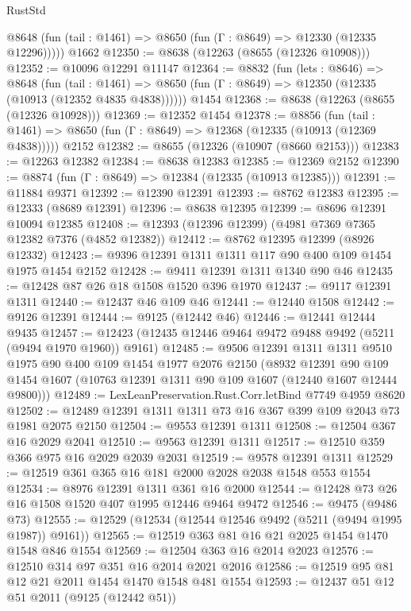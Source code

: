 \begin{lexlean}{RustStd}
\begin{coremodule}
      @8648 (fun (tail : @1461) => @8650 (fun (Γ : @8649) => @12330 (@12335 @12296)))))
    @1662
@12350 := @8638 (@12263 (@8655 (@12326 @10908)))
@12352 := @10096 @12291 @11147
@12364 := @8832
    (fun (lets : @8646) =>
    @8648
      (fun (tail : @1461) =>
      @8650 (fun (Γ : @8649) => @12350 (@12335 (@10913 (@12352 @4835 @4838))))))
    @1454
@12368 := @8638 (@12263 (@8655 (@12326 @10928)))
@12369 := @12352 @1454
@12378 := @8856
    (fun (tail : @1461) => @8650 (fun (Γ : @8649) => @12368 (@12335 (@10913 (@12369 @4838)))))
    @2152
@12382 := @8655 (@12326 (@10907 (@8660 @2153)))
@12383 := @12263 @12382
@12384 := @8638 @12383
@12385 := @12369 @2152
@12390 := @8874 (fun (Γ : @8649) => @12384 (@12335 (@10913 @12385)))
@12391 := @11884 @9371
@12392 := @12390 @12391
@12393 := @8762 @12383
@12395 := @12333 (@8689 @12391)
@12396 := @8638 @12395
@12399 := @8696 @12391 @10094 @12385
@12408 := @12393 (@12396 @12399) (@4981 @7369 @7365 @12382 @7376 (@4852 @12382))
@12412 := @8762 @12395 @12399 (@8926 @12332)
@12423 := @9396 @12391 @1311 @1311 @117 @90 @400 @109 @1454 @1975 @1454 @2152
@12428 := @9411 @12391 @1311 @1340 @90 @46
@12435 := @12428 @87 @26 @18 @1508 @1520 @396 @1970
@12437 := @9117 @12391 @1311
@12440 := @12437 @46 @109 @46
@12441 := @12440 @1508
@12442 := @9126 @12391
@12444 := @9125 (@12442 @46)
@12446 := @12441 @12444 @9435
@12457 := @12423 (@12435 @12446 @9464 @9472 @9488 @9492 (@5211 (@9494 @1970 @1960)) @9161)
@12485 := @9506
    @12391
    @1311
    @1311
    @9510
    @1975
    @90
    @400
    @109
    @1454
    @1977
    @2076
    @2150
    (@8932
      @12391
      @90
      @109
      @1454
      @1607
      (@10763 @12391 @1311 @90 @109 @1607 (@12440 @1607 @12444 @9800)))
@12489 := LexLeanPreservation.Rust.Corr.letBind @7749 @4959 @8620
@12502 := @12489 @12391 @1311 @1311 @73 @16 @367 @399 @109 @2043 @73 @1981 @2075 @2150
@12504 := @9553 @12391 @1311
@12508 := @12504 @367 @16 @2029 @2041
@12510 := @9563 @12391 @1311
@12517 := @12510 @359 @366 @975 @16 @2029 @2039 @2031
@12519 := @9578 @12391 @1311
@12529 := @12519 @361 @365 @16 @181 @2000 @2028 @2038 @1548 @553 @1554
@12534 := @8976 @12391 @1311 @361 @16 @2000
@12544 := @12428 @73 @26 @16 @1508 @1520 @407 @1995 @12446 @9464 @9472
@12546 := @9475 (@9486 @73)
@12555 := @12529 (@12534 (@12544 @12546 @9492 (@5211 (@9494 @1995 @1987)) @9161))
@12565 := @12519 @363 @81 @16 @21 @2025 @1454 @1470 @1548 @846 @1554
@12569 := @12504 @363 @16 @2014 @2023
@12576 := @12510 @314 @97 @351 @16 @2014 @2021 @2016
@12586 := @12519 @95 @81 @12 @21 @2011 @1454 @1470 @1548 @481 @1554
@12593 := @12437 @51 @12 @51 @2011 (@9125 (@12442 @51))

\end{coremodule}
\end{lexlean}
